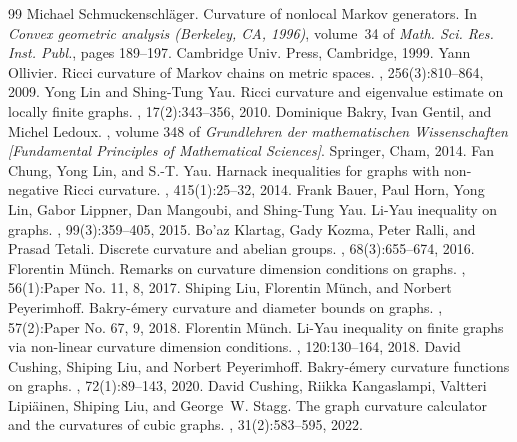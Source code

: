 \documentclass[10pt,a4paper]{amsart}
\begin{document}
\begin{thebibliography}{99}
 Michael Schmuckenschl\"ager. \newblock Curvature of nonlocal {M}arkov generators. \newblock In {\em Convex geometric analysis ({B}erkeley, {CA}, 1996)}, volume~34 of {\em Math. Sci. Res. Inst. Publ.}, pages 189--197. Cambridge Univ. Press, Cambridge, 1999.
 Yann Ollivier. \newblock Ricci curvature of {M}arkov chains on metric spaces. , 256(3):810--864, 2009.
 Yong Lin and Shing-Tung Yau. \newblock Ricci curvature and eigenvalue estimate on locally finite graphs. , 17(2):343--356, 2010.
 Dominique Bakry, Ivan Gentil, and Michel Ledoux. , volume 348 of {\em Grundlehren der mathematischen Wissenschaften [Fundamental Principles of Mathematical Sciences]}. \newblock Springer, Cham, 2014.
 Fan Chung, Yong Lin, and S.-T. Yau. \newblock Harnack inequalities for graphs with non-negative {R}icci curvature. , 415(1):25--32, 2014.
 Frank Bauer, Paul Horn, Yong Lin, Gabor Lippner, Dan Mangoubi, and Shing-Tung Yau. \newblock Li-{Y}au inequality on graphs. , 99(3):359--405, 2015.
 Bo'az Klartag, Gady Kozma, Peter Ralli, and Prasad Tetali. \newblock Discrete curvature and abelian groups. , 68(3):655--674, 2016.
 Florentin M\"unch. \newblock Remarks on curvature dimension conditions on graphs. , 56(1):Paper No. 11, 8, 2017.
 Shiping Liu, Florentin M\"unch, and Norbert Peyerimhoff. \newblock Bakry-\'emery curvature and diameter bounds on graphs. , 57(2):Paper No. 67, 9, 2018.
 Florentin M\"unch. \newblock Li-{Y}au inequality on finite graphs via non-linear curvature dimension conditions. , 120:130--164, 2018.
 David Cushing, Shiping Liu, and Norbert Peyerimhoff. \newblock Bakry-\'emery curvature functions on graphs. , 72(1):89--143, 2020.
 David Cushing, Riikka Kangaslampi, Valtteri Lipi\"ainen, Shiping Liu, and George~W. Stagg. \newblock The graph curvature calculator and the curvatures of cubic graphs. , 31(2):583--595, 2022.

\end{thebibliography}
\end{document}
